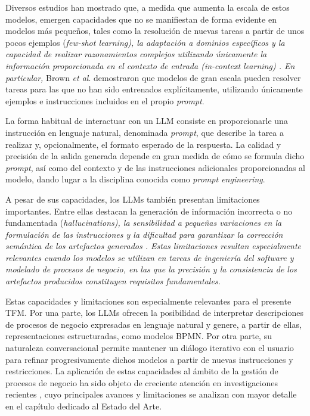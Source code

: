 Diversos estudios han mostrado que, a medida que aumenta la escala de estos modelos, emergen capacidades que no se manifiestan de forma evidente en modelos más pequeños, tales como la resolución de nuevas tareas a partir de unos pocos ejemplos (\textit{few-shot learning), la adaptación a dominios específicos y la capacidad de realizar razonamientos complejos utilizando únicamente la información proporcionada en el contexto de entrada (in-context learning) \cite{brown2020, wei2022}. En particular,} Brown \textit{et al}. \cite{brown2020} demostraron que modelos de gran escala pueden  resolver  tareas  para las que no han sido entrenados explícitamente, utilizando únicamente ejemplos e instrucciones incluidos en el propio \textit{prompt}.

La forma habitual de interactuar con un LLM consiste en proporcionarle una instrucción en lenguaje natural, denominada \textit{prompt}, que describe la tarea a realizar y, opcionalmente, el formato esperado de la respuesta. La calidad y precisión de la salida generada depende en gran medida de cómo se formula dicho \textit{prompt}, así como del contexto y de  las instrucciones adicionales  proporcionadas al modelo, dando lugar a la disciplina conocida como \textit{prompt engineering}.

A pesar de sus capacidades, los LLMs también presentan limitaciones importantes. Entre ellas destacan la generación de información incorrecta o no fundamentada (\textit{hallucinations), la sensibilidad a pequeñas variaciones en la formulación de las instrucciones y la dificultad para garantizar la corrección semántica de los artefactos generados \cite{ji2023, feuerriegel2024}. Estas limitaciones resultan especialmente relevantes cuando los modelos se utilizan en tareas de ingeniería del software y modelado de procesos de negocio, en las que la precisión y la consistencia de los artefactos producidos constituyen requisitos fundamentales.}

Estas capacidades   y limitaciones son especialmente relevantes para el presente TFM. Por una parte,  los LLMs ofrecen la posibilidad de interpretar descripciones de procesos de negocio expresadas en lenguaje natural y genere, a partir de ellas, representaciones estructuradas, como modelos BPMN. Por otra parte, su naturaleza conversacional permite mantener un diálogo iterativo con el usuario para refinar progresivamente dichos modelos a partir de nuevas instrucciones  y restricciones. La aplicación de estas capacidades al ámbito de la gestión de procesos de negocio ha sido objeto de  creciente atención en investigaciones  recientes \cite{kourani2025evaluating, kourani2024process, klievtsova2023, abb2023, bise2025bpmn, fillies2024}, cuyo  principales avances y limitaciones se analizan con mayor  detalle en el capítulo dedicado al Estado del Arte.

